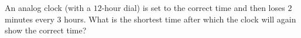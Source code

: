 An analog clock (with a $12$-hour dial) is set to the correct time and then loses $2$ minutes every $3$ hours. What is the shortest time after which the clock will again show the correct time?
